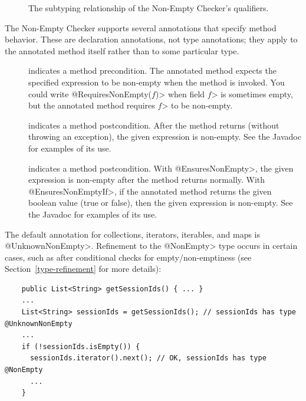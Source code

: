 \begin{figure}
\caption{The subtyping relationship of the Non-Empty Checker's qualifiers.}
\label{fig-nonempty-hierarchy}
\end{figure}


The Non-Empty Checker supports several annotations that specify method
behavior.  These are declaration annotations, not type annotations;  they
apply to the annotated method itself rather than to some particular type.

\begin{description}

\item[]
  indicates a method precondition.  The annotated method expects the
  specified expression to be non-empty when the
  method is invoked.  You could write \<@RequiresNonEmpty($f$)> when field
  \<$f$> is sometimes empty, but the annotated method requires
  \<$f$> to be non-empty.

\item[]
  indicates a method postcondition.  After the method returns (without
  throwing an exception), the given
  expression is non-empty. See the Javadoc for examples of its use.

\item[]
  indicates a method postcondition.  With \<@EnsuresNonEmpty>, the given
  expression is non-empty after the method returns normally.  With
  \<@EnsuresNonEmptyIf>, if the annotated
  method returns the given boolean value (true or false), then the given
  expression is non-empty. See the Javadoc for examples of its use.

\end{description}



The default annotation for collections, iterators, iterables, and maps is
\<@UnknownNonEmpty>.
Refinement to the \<@NonEmpty> type occurs in certain cases, such as after
conditional checks for empty/non-emptiness (see Section~\ref{type-refinement} for
more details):

\begin{Verbatim}
    public List<String> getSessionIds() { ... }
    ...
    List<String> sessionIds = getSessionIds(); // sessionIds has type @UnknownNonEmpty
    ...
    if (!sessionIds.isEmpty()) {
      sessionIds.iterator().next(); // OK, sessionIds has type @NonEmpty
      ...
    }
\end{Verbatim}

